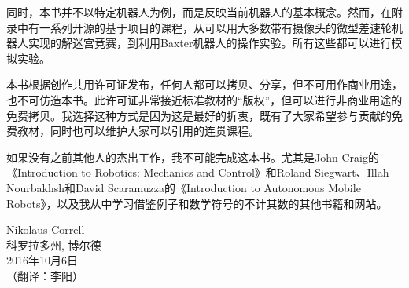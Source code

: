 同时，本书并不以特定机器人为例，而是反映当前机器人的基本概念。然而，在附录中有一系列开源的基于项目的课程，从可以用大多数带有摄像头的微型差速轮机器人实现的解迷宫竞赛，到利用Baxter机器人的操作实验。所有这些都可以进行模拟实验。

本书根据创作共用许可证发布，任何人都可以拷贝、分享，但不可用作商业用途，也不可仿造本书。此许可证非常接近标准教材的“版权”，但可以进行非商业用途的免费拷贝。我选择这种方式是因为这是最好的折衷，既有了大家希望参与贡献的免费教材，同时也可以维护大家可以引用的连贯课程。

如果没有之前其他人的杰出工作，我不可能完成这本书。尤其是John Craig的《Introduction to Robotics: Mechanics and Control》和Roland Siegwart、Illah Nourbakhsh和David Scaramuzza的《Introduction to Autonomous Mobile Robots》，以及我从中学习借鉴例子和数学符号的不计其数的其他书籍和网站。


\begin{flushright}
Nikolaus Correll\\
科罗拉多州, 博尔德\\
2016年10月6日\\
（翻译：李阳）
\end{flushright}